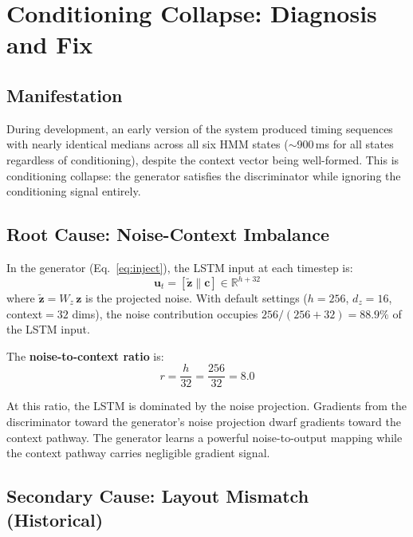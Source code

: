 \documentclass[sigconf,nonacm]{acmart}
\begin{document}
\section{Conditioning Collapse: Diagnosis and Fix}

\subsection{Manifestation}

During development, an early version of the system produced timing sequences
with nearly identical medians across all six HMM states ($\sim$900\,ms for
all states regardless of conditioning), despite the context vector being
well-formed.
This is conditioning collapse: the generator satisfies the discriminator
while ignoring the conditioning signal entirely.

\subsection{Root Cause: Noise-Context Imbalance}

In the generator (Eq.~\ref{eq:inject}), the LSTM input at each timestep is:
\begin{equation}
\mathbf{u}_t = [\tilde{\mathbf{z}} \| \mathbf{c}]
  \in \mathbb{R}^{h + 32}
  \label{eq:concat}
\end{equation}
where $\tilde{\mathbf{z}} = W_z\,\mathbf{z}$ is the projected noise.
With default settings ($h = 256$, $d_z = 16$, context$= 32$ dims), the
noise contribution occupies $256 / (256 + 32) = 88.9\%$ of the LSTM input.

The \textbf{noise-to-context ratio} is:
\begin{equation}
r = \frac{h}{32} = \frac{256}{32} = 8.0
\end{equation}

At this ratio, the LSTM is dominated by the noise projection.
Gradients from the discriminator toward the generator's noise projection
dwarf gradients toward the context pathway.
The generator learns a powerful noise-to-output mapping while the
context pathway carries negligible gradient signal.

\subsection{Secondary Cause: Layout Mismatch (Historical)}
\end{document}
